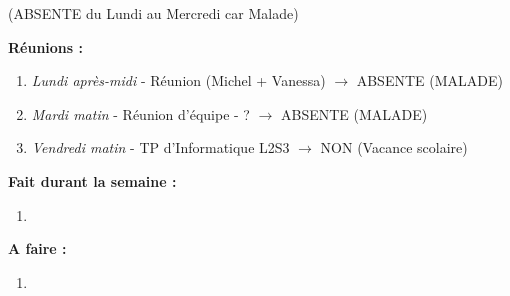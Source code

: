(ABSENTE du Lundi au Mercredi car Malade)

\textbf{Réunions :}
\begin{enumerate}[label=\textbullet]
	\item \textit{Lundi après-midi} - Réunion (Michel + Vanessa) $\rightarrow$ ABSENTE (MALADE)
	\item \textit{Mardi matin} - Réunion d'équipe - ? $\rightarrow$ ABSENTE (MALADE)
	\item \textit{Vendredi matin} - TP d'Informatique L2S3 $\rightarrow$ NON (Vacance scolaire)
\end{enumerate}
\textbf{Fait durant la semaine :}
\begin{enumerate}[label=\textbullet]
	\item 
\end{enumerate}

\textbf{A faire :}
\begin{enumerate}[label=\textbullet]
	\item 
\end{enumerate}
